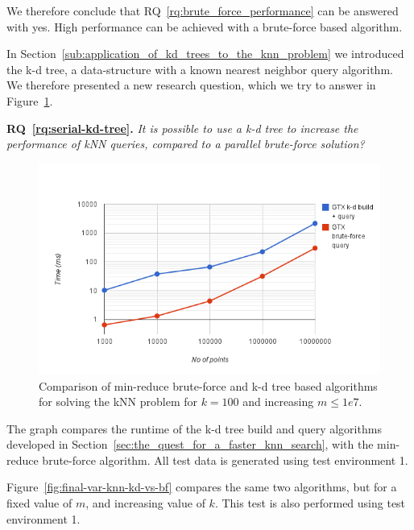 We therefore conclude that RQ~\ref{rq:brute_force_performance} can be answered with yes. High performance can be achieved with a brute-force based algorithm.

In Section~\ref{sub:application_of_kd_trees_to_the_knn_problem} we introduced the k-d tree, a data-structure with a known  nearest neighbor query algorithm. We therefore presented a new research question, which we try to answer in Figure~\ref{fig:final-knn-kd-vs-bf}.

\textbf{RQ~\ref{rq:serial-kd-tree}.} \emph{It is possible to use a k-d tree to increase the performance of kNN queries, compared to a parallel brute-force solution?}

\begin{figure}[ht!]
    \centering
    \includegraphics[width=120mm]{../gfx/final-knn-kd-vs-bf.png}
    \caption{Comparison of min-reduce brute-force and k-d tree based algorithms for solving the kNN problem for $k=100$ and increasing $m\le1e7$.}
    \label{fig:final-knn-kd-vs-bf}
\end{figure}

The graph compares the runtime of the k-d tree build and query algorithms developed in Section~\ref{sec:the_quest_for_a_faster_knn_search}, with the min-reduce brute-force algorithm. All test data is generated using test environment 1.

Figure~\ref{fig:final-var-knn-kd-vs-bf} compares the same two algorithms, but for a fixed value of $m$, and increasing value of $k$. This test is also performed using test environment 1.

